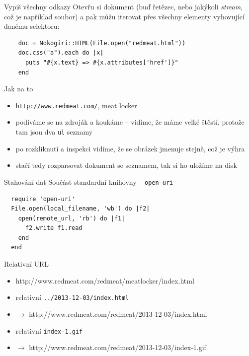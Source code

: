 \documentclass{beamer}
\begin{document}
\begin{frame}[fragile]{Vypiš všechny odkazy}
  Otevřu si dokument (buď řetězec, nebo jakýkoli \emph{stream}, což je například soubor) a pak můžu iterovat přes všechny elementy vyhovující danému selektoru:
  \scriptsize
  \begin{verbatim}
    doc = Nokogiri::HTML(File.open("redmeat.html"))
    doc.css("a").each do |x|
      puts "#{x.text} => #{x.attributes['href']}"
    end
  \end{verbatim}
\end{frame}

\begin{frame}{Jak na to}
  \begin{itemize}
    \item \texttt{http://www.redmeat.com/}, meat locker
    \item podíváme se na zdroják a koukáme -- vidíme, že máme velké štěstí, protože tam jsou dva \texttt{ul} seznamy
    \item po rozkliknutí a inspekci vidíme, že se obrázek jmenuje stejně, což je výhra
    \item stačí tedy rozparsovat dokument se seznamem, tak si ho uložíme na disk
  \end{itemize}
\end{frame}


\begin{frame}[fragile]{Stahování dat}
  Součást standardní knihovny -- \texttt{open-uri}
  \scriptsize
\begin{verbatim}
  require 'open-uri'
  File.open(local_filename, 'wb') do |f2|
    open(remote_url, 'rb') do |f1|
      f2.write f1.read
    end
  end
\end{verbatim}
\end{frame}

\begin{frame}{Relativní URL}
  \begin{itemize}
    \item http://www.redmeat.com/redmeat/meatlocker/index.html
    \item relativní \texttt{../2013-12-03/index.html}
    \item $\to$ http://www.redmeat.com/redmeat/2013-12-03/index.html
    \item relativní \texttt{index-1.gif}
    \item $\to$ http://www.redmeat.com/redmeat/2013-12-03/index-1.gif
  \end{itemize}
\end{frame}
\end{document}
